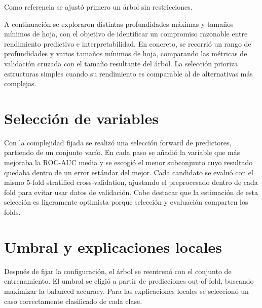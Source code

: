 Como referencia se ajustó primero un árbol sin restricciones.

A continuación se exploraron distintas profundidades máximas y tamaños mínimos
de hoja, con el objetivo de identificar un compromiso razonable entre rendimiento
predictivo e interpretabilidad. En concreto, se recorrió un rango de
profundidades y varios tamaños mínimos de hoja, comparando las métricas de
validación cruzada con el tamaño resultante del árbol. La selección prioriza
estructuras simples cuando su rendimiento es comparable al de alternativas más
complejas.

\section{Selección de variables}

Con la complejidad fijada se realizó una selección forward de predictores,
partiendo de un conjunto vacío. En cada paso se añadió la variable que más
mejoraba la ROC-AUC media y se escogió el menor subconjunto cuyo resultado
quedaba dentro de un error estándar del mejor. Cada candidato se evaluó con el
mismo 5-fold stratified cross-validation, ajustando el preprocesado dentro de
cada fold para evitar usar datos de validación. Cabe destacar que la estimación
de esta selección es ligeramente optimista porque selección y evaluación
comparten los folds.

\section{Umbral y explicaciones locales}

Después de fijar la configuración, el árbol se reentrenó con el conjunto de
entrenamiento. El umbral se eligió a partir de predicciones out-of-fold,
buscando maximizar la balanced accuracy. Para las explicaciones locales se
seleccionó un caso correctamente clasificado de cada clase.
